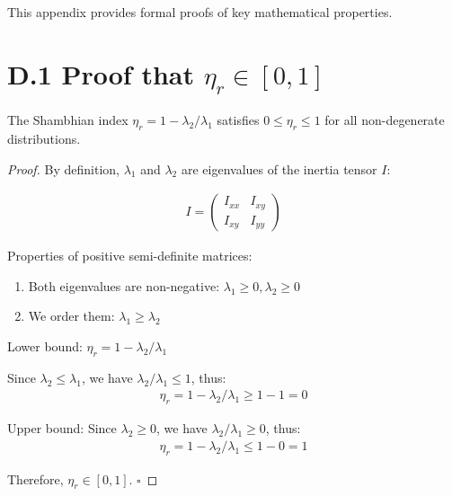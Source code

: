 

This appendix provides formal proofs of key mathematical properties.

\section{D.1 Proof that $\eta_r \in [0,1]$}

\begin{theorem}
The Shambhian index $\eta_r = 1 - \lambda_2/\lambda_1$ satisfies $0 \leq \eta_r \leq 1$ for all non-degenerate distributions.
\end{theorem}

\begin{proof}
By definition, $\lambda_1$ and $\lambda_2$ are eigenvalues of the inertia tensor $I$:

\begin{align}
    I = \begin{pmatrix} I_{xx} & I_{xy} \\ I_{xy} & I_{yy} \end{pmatrix}
\end{align}

Properties of positive semi-definite matrices:
\begin{enumerate}
    \item Both eigenvalues are non-negative: $\lambda_1 \geq 0, \lambda_2 \geq 0$
    \item We order them: $\lambda_1 \geq \lambda_2$
\end{enumerate}

Lower bound: $\eta_r = 1 - \lambda_2/\lambda_1$

Since $\lambda_2 \leq \lambda_1$, we have $\lambda_2/\lambda_1 \leq 1$, thus:
\begin{align}
    \eta_r = 1 - \lambda_2/\lambda_1 \geq 1 - 1 = 0
\end{align}

Upper bound: Since $\lambda_2 \geq 0$, we have $\lambda_2/\lambda_1 \geq 0$, thus:
\begin{align}
    \eta_r = 1 - \lambda_2/\lambda_1 \leq 1 - 0 = 1
\end{align}

Therefore, $\eta_r \in [0, 1]$. $\square$

\end{proof}

